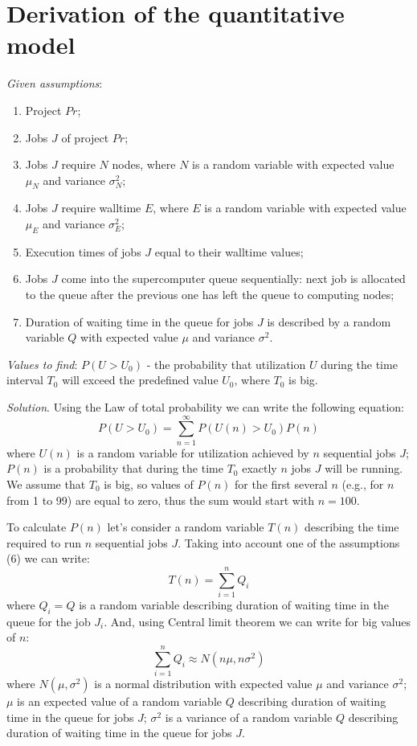 \section{Derivation of the quantitative model} \label{appendix-model-derivation}

\textit{Given assumptions}:
\begin{enumerate}
    \item Project $Pr$;
    \item Jobs $J$ of project $Pr$;
    \item Jobs $J$ require $N$ nodes, where $N$ is a random variable with expected value $\mu_{N}$ and variance $\sigma_{N}^2$;
    \item Jobs $J$ require walltime $E$, where $E$ is a random variable with expected value $\mu_{E}$ and variance $\sigma_{E}^2$;
    \item Execution times of jobs $J$ equal to their walltime values;
    \item Jobs $J$ come into the supercomputer queue sequentially: next job is allocated to the queue after the previous one has left the queue to computing nodes;
    \item Duration of waiting time in the queue for jobs $J$ is described by a random variable $Q$ with expected value $\mu$ and variance $\sigma^2$.
\end{enumerate}
\textit{Values to find}:
$P(U > U_0)$ - the probability that utilization $U$ during the time interval $T_0$ will exceed the predefined value $U_0$, where $T_0$ is big.

\textit{Solution}.
Using the Law of total probability we can write the following equation:
\begin{equation}
    \label{eq-1}
    P(U > U_0) = \sum\limits_{n=1}^{\infty}P(U(n) > U_0) P(n)
\end{equation}
where $U(n)$ is a random variable for utilization achieved by $n$ sequential jobs $J$; $P(n)$ is a probability that during the time $T_0$ exactly $n$ jobs $J$ will be running. We assume that $T_0$ is big, so values of $P(n)$ for the first several $n$ (e.g., for $n$ from 1 to 99) are equal to zero, thus the sum would start with $n=100$.

To calculate $P(n)$ let's consider a random variable $T(n)$ describing the time required to run $n$ sequential jobs $J$. Taking into account one of the assumptions (6) we can write:
\begin{equation}
    \label{eq-2}
    T(n) = \sum\limits_{i=1}^{n}Q_{i}
\end{equation}
where $Q_{i} = Q$ is a random variable describing duration of waiting time in the queue for the job $J_{i}$. And, using Central limit theorem we can write for big values of $n$:
\begin{equation}
    \label{eq-3}
    \sum\limits_{i=1}^{n}Q_{i} \approx N(n\mu, n\sigma^2)
\end{equation}
where $N(\mu, \sigma^2)$ is a normal distribution with expected value $\mu$ and variance $\sigma^2$; $\mu$ is an expected value of a random variable $Q$ describing duration of waiting time in the queue for jobs $J$; $\sigma^2$ is a variance of a random variable $Q$ describing duration of waiting time in the queue for jobs $J$.

